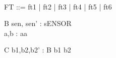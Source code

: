 
\begin{zed}
[sENSOR] \\
FT ::= ft1 | ft2 | ft3 | ft4 | ft5 | ft6
\end{zed}

\begin{schema}{B}
sen, sen' : sENSOR \\
a,b : aa
\end{schema}

\begin{schema}{C}
b1,b2,b2' : B
\where
b1 \neq b2
\end{schema}
